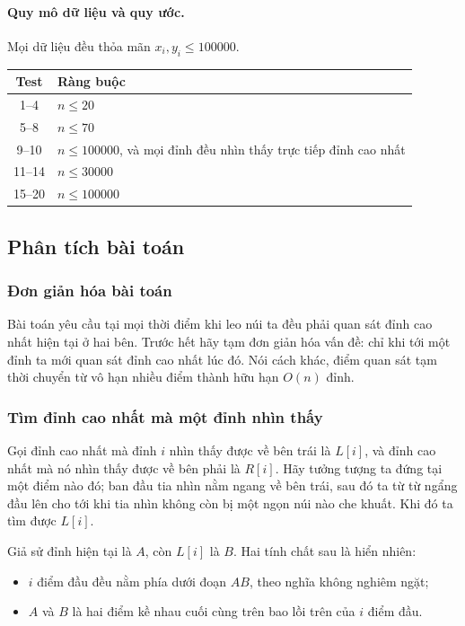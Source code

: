 \documentclass[11pt]{article}
\begin{document}
\paragraph{Quy mô dữ liệu và quy ước.}
Mọi dữ liệu đều thỏa mãn \(x_i,y_i\le 100000\).

\begin{center}
\begin{tabular}{c l}
\textbf{Test} & \textbf{Ràng buộc} \\
\hline
1--4 & \(n\le 20\) \\
5--8 & \(n\le 70\) \\
9--10 & \(n\le 100000\), và mọi đỉnh đều nhìn thấy trực tiếp đỉnh cao nhất \\
11--14 & \(n\le 30000\) \\
15--20 & \(n\le 100000\)
\end{tabular}
\end{center}

\subsection{Phân tích bài toán}

\subsubsection{Đơn giản hóa bài toán}

Bài toán yêu cầu tại mọi thời điểm khi leo núi ta đều phải quan sát đỉnh cao
nhất hiện tại ở hai bên. Trước hết hãy tạm đơn giản hóa vấn đề: chỉ khi tới
một đỉnh ta mới quan sát đỉnh cao nhất lúc đó. Nói cách khác, điểm quan sát
tạm thời chuyển từ vô hạn nhiều điểm thành hữu hạn \(O(n)\) đỉnh.

\subsubsection{Tìm đỉnh cao nhất mà một đỉnh nhìn thấy}

Gọi đỉnh cao nhất mà đỉnh \(i\) nhìn thấy được về bên trái là \(L[i]\), và
đỉnh cao nhất mà nó nhìn thấy được về bên phải là \(R[i]\). Hãy tưởng tượng
ta đứng tại một điểm nào đó; ban đầu tia nhìn nằm ngang về bên trái, sau đó
ta từ từ ngẩng đầu lên cho tới khi tia nhìn không còn bị một ngọn núi nào che
khuất. Khi đó ta tìm được \(L[i]\).

Giả sử đỉnh hiện tại là \(A\), còn \(L[i]\) là \(B\). Hai tính chất sau là
hiển nhiên:
\begin{itemize}
  \item \(i\) điểm đầu đều nằm phía dưới đoạn \(AB\), theo nghĩa không nghiêm
  ngặt;
  \item \(A\) và \(B\) là hai điểm kề nhau cuối cùng trên bao lồi trên của
  \(i\) điểm đầu.
\end{itemize}
\end{document}
